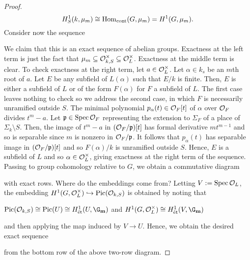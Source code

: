 \documentclass[11pt]{article}
\begin{document}
\begin{proof}
$$H_S^1(k,\mu_m)\cong\operatorname{Hom}_{\operatorname{cont}}(G,\mu_m)=H^1(G,\mu_m).$$
Consider now the sequence 
\begin{center}
\end{center}
We claim that this is an exact sequence of abelian groups. Exactness at the left term is just the fact that $\mu_m\subseteq\mathcal{O}_{k,S}^{\times}\subseteq\mathcal{O}_L^{\times}$. Exactness at the middle term is clear. To check exactness at the right term, let $a\in\mathcal{O}_L^{\times}$. Let $\alpha\in k_s$ be an $m$th root of $a$. Let $E$ be any subfield of $L(\alpha)$ such that $E/k$ is finite. Then, $E$ is either a subfield of $L$ or of the form $F(\alpha)$ for $F$ a subfield of $L$. The first case leaves nothing to check so we address the second case, in which $F$ is necessarily unramified outside $S$. The minimal polynomial $p_{\alpha}(t)\in\mathcal{O}_F[t]$ of $\alpha$ over $\mathcal{O}_F$ divides $t^m-a$. Let $\mathfrak{p}\in\operatorname{Spec}\mathcal{O}_F$ representing the extension to $\Sigma_F$ of a place of $\Sigma_k\setminus S$. Then, the image of $t^m-a$ in $(\mathcal{O}_F/\mathfrak{p})[t]$ has formal derivative $mt^{m-1}$ and so is separable since $m$ is nonzero in $\mathcal{O}_F/\mathfrak{p}$. It follows that $p_{\alpha}(t)$ has separable image in $(\mathcal{O}_F/\mathfrak{p})[t]$ and so $F(\alpha)/k$ is unramified outside $S$. Hence, $E$ is a subfield of $L$ and so $\alpha\in\mathcal{O}_L^{\times}$, giving exactness at the right term of the sequence. Passing to group cohomology relative to $G$, we obtain a commutative diagram
\begin{center}
\end{center}
with exact rows. Where do the embeddings come from? Letting $V:=\operatorname{Spec}\mathcal{O}_L$, the embedding $H^1(G,\mathcal{O}_L^{\times})\hookrightarrow\operatorname{Pic}(\mathcal{O}_{k,S})$ is obtained by noting that 
\begin{center}
$\Pic(\O_{k,S})\iso\Pic(U)\iso H_{\et}^1(U,\G_{\mathbf{m}})$ and $H^1(G,\O_L^{\times})\iso H_{\et}^1(V,\G_{\mathbf{m}})$
\end{center}
and then applying the map induced by $V\to U$. Hence, we obtain the desired exact sequence
\begin{center}
\end{center}
from the bottom row of the above two-row diagram.
\end{proof}
\end{document}
